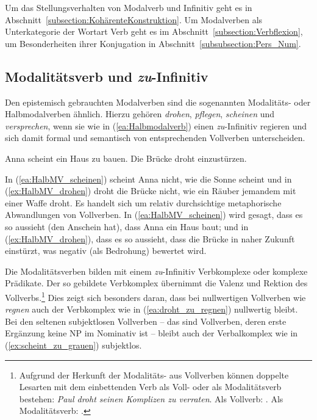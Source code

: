 Um das Stellungsverhalten von Modalverb und Infinitiv geht es in Abschnitt~\ref{subsection:KohärenteKonstruktion}. Um Modalverben als Unterkategorie der Wortart Verb geht es im Abschnitt~\ref{subsection:Verbflexion}, um Besonderheiten ihrer Konjugation in Abschnitt~\ref{subsubsection:Pers_Num}.



\subsection{Modalitätsverb und \textit{zu}-Infinitiv}\label{subsection:Modalitätsverb_zu_Inf}

Den epistemisch gebrauchten Modalverben sind die sogenannten Modalitäts- oder Halbmodalverben ähnlich. Hierzu gehören \zB \textit{drohen}, \textit{pflegen}, \textit{scheinen} und \textit{versprechen}, wenn sie wie in (\ref{ea:Halbmodalverb}) einen \textit{zu}-Infinitiv regieren und sich damit formal und semantisch von entsprechenden Vollverben unterscheiden.

\ea \label{ea:Halbmodalverb}
\ea \label{ea:HalbMV_scheinen} Anna scheint ein Haus zu bauen.
\ex \label{ex:HalbMV_drohen} Die Brücke droht einzustürzen.
\z 
\z 

In (\ref{ea:HalbMV_scheinen}) scheint Anna nicht, wie die Sonne scheint und in (\ref{ex:HalbMV_drohen}) droht die Brücke nicht, wie ein Räuber jemandem mit einer Waffe droht. Es handelt sich um relativ durchsichtige metaphorische Abwandlungen von Vollverben. In (\ref{ea:HalbMV_scheinen}) wird gesagt, dass es so aussieht (den Anschein hat), dass Anna ein Haus baut; und in (\ref{ex:HalbMV_drohen}), dass es so aussieht, dass die Brücke in naher Zukunft einstürzt, was negativ (als Bedrohung) bewertet wird. 

Die Modalitätsverben bilden mit einem \textit{zu}-Infinitiv Verbkomplexe oder komplexe Prädikate. Der so gebildete Verbkomplex übernimmt die Valenz und Rektion des Vollverbs.\footnote{Aufgrund der Herkunft der Modalitäts- aus Vollverben können doppelte Lesarten mit dem einbettenden Verb als Voll- oder als Modalitätsverb bestehen: \textit{Paul droht seinen Komplizen zu verraten}. Als Vollverb: . Als Modalitätsverb: .} Dies zeigt sich besonders daran, dass bei nullwertigen Vollverben wie \textit{regnen} auch der Verbkomplex wie in (\ref{ea:droht_zu_regnen}) nullwertig bleibt. Bei den seltenen subjektlosen Vollverben -- das sind Vollverben, deren erste Ergänzung keine NP im Nominativ ist -- bleibt auch der Verbalkomplex wie in (\ref{ex:scheint_zu_grauen}) subjektlos.

